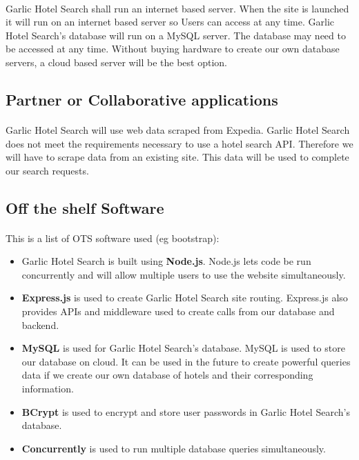 \documentclass[]{article}
\begin{document}
\paragraph{}
Garlic Hotel Search shall run an internet based server. When the site is launched it will run on an internet based server so Users can access at any time. Garlic Hotel Search’s database will run on a MySQL server. The database may need to be accessed at any time. Without buying hardware to create our own database servers, a cloud based server will be the best option.

\subsection{Partner or Collaborative applications}
\paragraph{}
Garlic Hotel Search will use web data scraped from Expedia. Garlic Hotel Search does not meet the requirements necessary to use a hotel search API. Therefore we will have to scrape data from an existing site. This data will be used to complete our search requests.

\subsection{Off the shelf Software}
\paragraph{}
This is a list of OTS software used (eg bootstrap):
\begin{itemize}
    \item Garlic Hotel Search is built using \textbf{Node.js}. Node.js lets code be run concurrently and will allow multiple users to use the website simultaneously.
    \item \textbf{Express.js} is used to create Garlic Hotel Search site routing. Express.js also provides APIs and middleware used to create calls from our database and backend.
    \item  \textbf{MySQL} is used for Garlic Hotel Search’s database. MySQL is used to store our database on cloud. It can be used in the future to create powerful queries data if we create our own database of hotels and their corresponding information.
    \item \textbf{BCrypt} is used to encrypt and store user passwords in Garlic Hotel Search’s database.
    \item \textbf{Concurrently} is used to run multiple database queries simultaneously.
\end{itemize}
\end{document}
